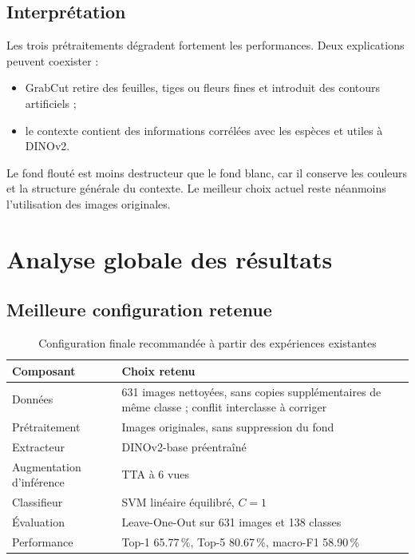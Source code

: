 \documentclass[12pt,a4paper]{report}
\newcommand{\pct}[1]{\num{#1}\,\%}
\begin{document}
\section{Interprétation}

Les trois prétraitements dégradent fortement les performances. Deux explications peuvent coexister :
\begin{itemize}
  \item GrabCut retire des feuilles, tiges ou fleurs fines et introduit des contours artificiels ;
  \item le contexte contient des informations corrélées avec les espèces et utiles à DINOv2.
\end{itemize}

Le fond flouté est moins destructeur que le fond blanc, car il conserve les couleurs et la structure générale du contexte. Le meilleur choix actuel reste néanmoins l'utilisation des images originales.

\chapter{Analyse globale des résultats}

\section{Meilleure configuration retenue}

\begin{table}[H]
\centering
\caption{Configuration finale recommandée à partir des expériences existantes}
\begin{tabularx}{\textwidth}{lX}
\toprule
\textbf{Composant} & \textbf{Choix retenu}\\
\midrule
Données & 631 images nettoyées, sans copies supplémentaires de même classe ; conflit interclasse à corriger\\
Prétraitement & Images originales, sans suppression du fond\\
Extracteur & DINOv2-base préentraîné\\
Augmentation d'inférence & TTA à 6 vues\\
Classifieur & SVM linéaire équilibré, $C=1$\\
Évaluation & Leave-One-Out sur 631 images et 138 classes\\
Performance & Top-1 \pct{65,77}, Top-5 \pct{80,67}, macro-F1 \pct{58,90}\\
\bottomrule
\end{tabularx}
\end{table}
\end{document}
